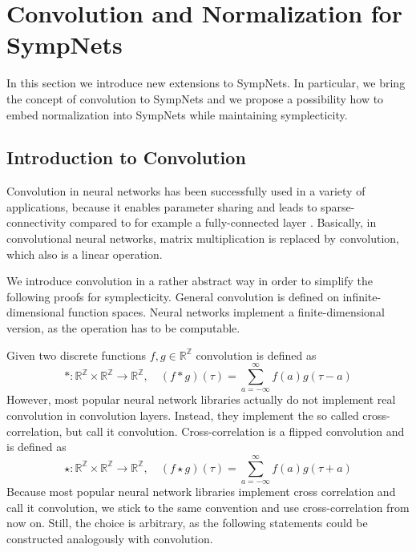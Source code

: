 \documentclass[twoside,a4paper]{article}
\begin{document}
\section{Convolution and Normalization for SympNets}\label{sec_conv_and_norm_for_sympnets}

In this section we introduce new extensions to SympNets. In particular, we bring the concept
of convolution to SympNets and we propose a possibility how to embed normalization into SympNets while
maintaining symplecticity.

\subsection{Introduction to Convolution}

Convolution in neural networks has been successfully used in a variety of 
applications, because it enables parameter sharing and leads to 
sparse-connectivity compared to for example a fully-connected layer \cite{Goodfellow2016}.
Basically, in convolutional neural networks, matrix multiplication is 
replaced by convolution, which also is a linear operation.

We introduce convolution in a rather abstract way in order to simplify the following proofs
for symplecticity.
General convolution is defined on infinite-dimensional function spaces.
Neural networks implement a finite-dimensional version, as the operation has to be
computable.

Given two discrete functions $f,g \in \mathbb{R}^\mathbb{Z}$ convolution is defined as 
\begin{equation*}
	*: \mathbb{R}^{\mathbb{Z}} \times \mathbb{R}^{\mathbb{Z}} \to \mathbb{R}^{\mathbb{Z}},
	\quad (f*g)(\tau) = \sum^{\infty}_{a=-\infty} f(a) g(\tau - a)
\end{equation*}
However, most popular neural network libraries actually do not implement real convolution
in convolution layers. Instead, they implement the so called cross-correlation, but call it convolution. 
Cross-correlation is a flipped convolution and is defined as
\begin{equation*}
	\star: \mathbb{R}^{\mathbb{Z}} \times \mathbb{R}^{\mathbb{Z}} \to \mathbb{R}^{\mathbb{Z}},
	\quad (f \star g)(\tau) = \sum^{\infty}_{a=-\infty} f(a) g(\tau + a)
\end{equation*}
Because most popular neural network libraries implement cross correlation and call it convolution,
we stick to the same convention and use cross-correlation from now on.
Still, the choice is arbitrary, as the following statements could be constructed analogously with convolution.
\end{document}

